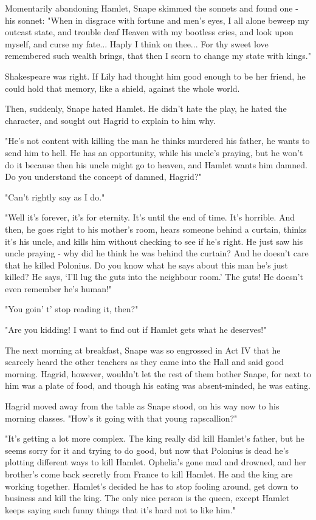 Momentarily abandoning Hamlet, Snape skimmed the sonnets and found one - his sonnet: "When in disgrace with fortune and men's eyes, I all alone beweep my outcast state, and trouble deaf Heaven with my bootless cries, and look upon myself, and curse my fate... Haply I think on thee... For thy sweet love remembered such wealth brings, that then I scorn to change my state with kings."

Shakespeare was right. If Lily had thought him good enough to be her friend, he could hold that memory, like a shield, against the whole world.

Then, suddenly, Snape hated Hamlet. He didn't hate the play, he hated the character, and sought out Hagrid to explain to him why.

"He's not content with killing the man he thinks murdered his father, he wants to send him to hell. He has an opportunity, while his uncle's praying, but he won't do it because then his uncle might go to heaven, and Hamlet wants him damned. Do you understand the concept of damned, Hagrid?"

"Can't rightly say as I do."

"Well it's forever, it's for eternity. It's until the end of time. It's horrible. And then, he goes right to his mother's room, hears someone behind a curtain, thinks it's his uncle, and kills him without checking to see if he's right. He just saw his uncle praying - why did he think he was behind the curtain? And he doesn't care that he killed Polonius. Do you know what he says about this man he's just killed? He says, `I'll lug the guts into the neighbour room.' The guts! He doesn't even remember he's human!"

"You goin' t' stop reading it, then?"

"Are you kidding! I want to find out if Hamlet gets what he deserves!"

The next morning at breakfast, Snape was so engrossed in Act IV that he scarcely heard the other teachers as they came into the Hall and said good morning. Hagrid, however, wouldn't let the rest of them bother Snape, for next to him was a plate of food, and though his eating was absent-minded, he was eating.

Hagrid moved away from the table as Snape stood, on his way now to his morning classes. "How's it going with that young rapscallion?"

"It's getting a lot more complex. The king really did kill Hamlet's father, but he seems sorry for it and trying to do good, but now that Polonius is dead he's plotting different ways to kill Hamlet. Ophelia's gone mad and drowned, and her brother's come back secretly from France to kill Hamlet. He and the king are working together. Hamlet's decided he has to stop fooling around, get down to business and kill the king. The only nice person is the queen, except Hamlet keeps saying such funny things that it's hard not to like him."

